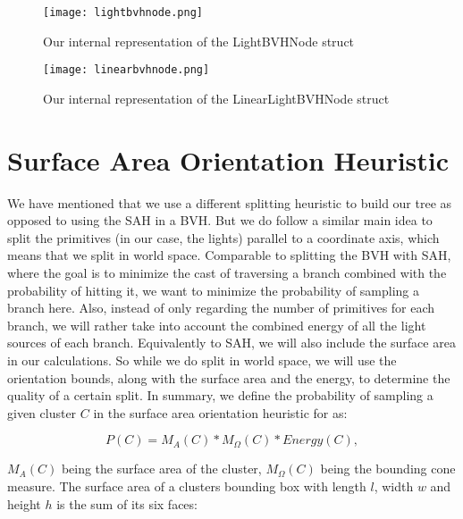 \begin{figure}
	\begin{center}
		\texttt{[image: lightbvhnode.png]}
		\caption{Our internal representation of the LightBVHNode struct}
		\label{fig:lightbvhnode}
	\end{center}
\end{figure}

\begin{figure}
	\begin{center}
		\texttt{[image: linearbvhnode.png]}
		\caption{Our internal representation of the LinearLightBVHNode struct}
		\label{fig:linearlightbvhnode}
	\end{center}
\end{figure}

\section{Surface Area Orientation Heuristic}
\label{sec:saoh}

We have mentioned that we use a different splitting heuristic to build our tree as opposed to using the SAH in a BVH. But we do follow a similar main idea to split the primitives (in our case, the lights) parallel to a coordinate axis, which means that we split in world space. Comparable to splitting the BVH with SAH, where the goal is to minimize the cast of traversing a branch combined with the probability of hitting it, we want to minimize the probability of sampling a branch here. Also, instead of only regarding the number of primitives for each branch, we will rather take into account the combined energy of all the light sources of each branch. Equivalently to SAH, we will also include the surface area in our calculations. So while we do split in world space, we will use the orientation bounds, along with the surface area and the energy, to determine the quality of a certain split. In summary, we define the probability of sampling a given cluster $C$ in the surface area orientation heuristic for as:

\begin{equation}
P(C) = M_A(C) * M_\Omega(C) * Energy(C),
\end{equation}

$M_A(C)$ being the surface area of the cluster, $M_\Omega(C)$ being the bounding cone measure. The surface area of a clusters bounding box with length $l$, width $w$ and height $h$ is the sum of its six faces:

